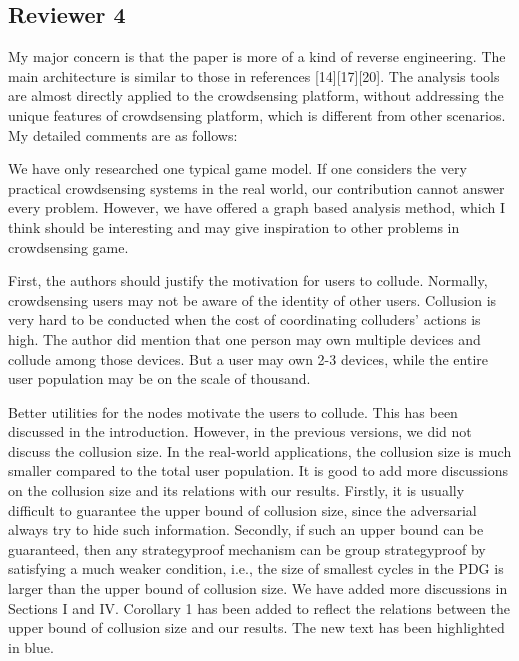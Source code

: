 \documentclass[a4paper,11pt]{exam}
\begin{document}
\begin{questions}
\section{Reviewer 4}
\question My major concern is that the paper is more of a kind of reverse engineering. The main architecture is similar to those in references [14][17][20]. The analysis tools are almost directly applied to the crowdsensing platform, without addressing the unique features of crowdsensing platform, which is different from other scenarios. My detailed comments are as follows:
\begin{solution}
We have only researched one typical game model. If one considers the very practical crowdsensing systems in the real world, our contribution cannot answer every problem. However, we have offered a graph based analysis method, which I think should be interesting and may give inspiration to other problems in crowdsensing game.
\end{solution}

\question First, the authors should justify the motivation for users to collude. Normally, crowdsensing users may not be aware of the identity of other users. Collusion is very hard to be conducted when the cost of coordinating colluders’ actions is high. The author did mention that one person may own multiple devices and collude among those devices. But a user may own 2-3 devices, while the entire user population may be on the scale of thousand. 
\begin{solution}
Better utilities for the nodes motivate the users to collude. This has been discussed in the introduction. However, in the previous versions, we did not discuss the collusion size. In the real-world applications, the collusion size is much smaller compared to the total user population. It is good to add more discussions on the collusion size and its relations with our results. Firstly, it is usually difficult to guarantee the upper bound of collusion size, since the adversarial always try to hide such information. Secondly, if such an upper bound can be guaranteed, then any strategyproof mechanism can be group strategyproof by satisfying a much weaker condition, i.e., the size of smallest cycles in the PDG is larger than the upper bound of collusion size. 
We have added more discussions in Sections I and IV. Corollary 1 has been added to reflect the relations between the upper bound of collusion size and our results. The new text has been highlighted in blue.
\end{solution}


\end{questions}
\end{document}
